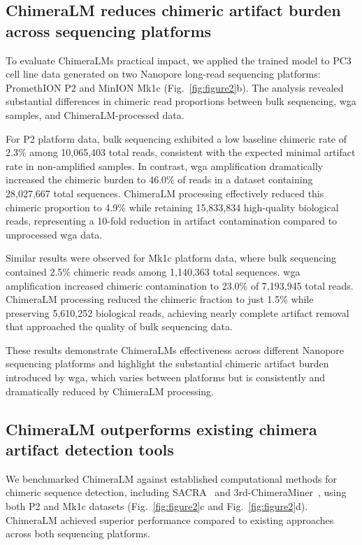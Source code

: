 \documentclass[pdflatex,sn-nature]{sn-jnl}%
\theoremstyle{thmstyleone}%
\theoremstyle{thmstyletwo}%
\theoremstyle{thmstylethree}%
\begin{document}
\subsection*{ChimeraLM reduces chimeric artifact burden across sequencing platforms}

To evaluate ChimeraLM\textquotesingle s practical impact, we applied the trained model to PC3 cell line data generated on two Nanopore long-read sequencing platforms: PromethION P2 and MinION Mk1c (Fig.~\ref{fig:figure2}b).
The analysis revealed substantial differences in chimeric read proportions between bulk sequencing, \gls{wga} samples, and ChimeraLM-processed data.

For P2 platform data, bulk sequencing exhibited a low baseline chimeric rate of 2.3\% among 10,065,403 total reads, consistent with the expected minimal artifact rate in non-amplified samples.
In contrast, \gls{wga} amplification dramatically increased the chimeric burden to 46.0\% of reads in a dataset containing 28,027,667 total sequences.
ChimeraLM processing effectively reduced this chimeric proportion to 4.9\% while retaining 15,833,834 high-quality biological reads, representing a 10-fold reduction in artifact contamination compared to unprocessed \gls{wga} data.

Similar results were observed for Mk1c platform data, where bulk sequencing contained 2.5\% chimeric reads among 1,140,363 total sequences.
\gls{wga} amplification increased chimeric contamination to 23.0\% of 7,193,945 total reads.
ChimeraLM processing reduced the chimeric fraction to just 1.5\% while preserving 5,610,252 biological reads, achieving nearly complete artifact removal that approached the quality of bulk sequencing data.

These results demonstrate ChimeraLM\textquotesingle s effectiveness across different Nanopore sequencing platforms and highlight the substantial chimeric artifact burden introduced by \gls{wga}, which varies between platforms but is consistently and dramatically reduced by ChimeraLM processing.

\subsection*{ChimeraLM outperforms existing chimera artifact detection tools}

We benchmarked ChimeraLM against established computational methods for chimeric sequence detection, including SACRA~\cite{kiguchi2021long} and 3rd-ChimeraMiner~\cite{lu2023exploration}, using both P2 and Mk1c datasets (Fig.~\ref{fig:figure2}c and Fig.~\ref{fig:figure2}d).
ChimeraLM achieved superior performance compared to existing approaches across both sequencing platforms.
\end{document}
